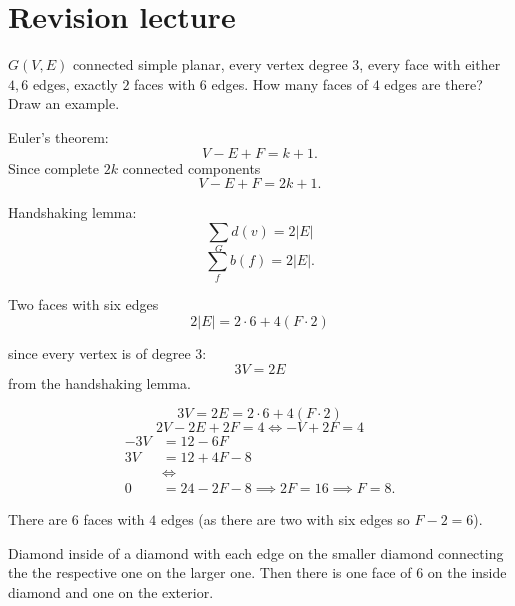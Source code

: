 \documentclass[10pt, a4paper]{article}
\begin{document}
\section{Revision lecture}

\begin{problem}
    $G(V, E)$ connected simple planar,
    every vertex degree $3$,
    every face with either $4, 6$ edges,
    exactly $2$ faces with $6$ edges.
    How many faces of $4$ edges are there?
    Draw an example.

    \begin{solution}
        Euler's theorem:
        \[
        V - E + F = k + 1.
        \]
        Since complete $2k$ connected components
        \[
        V - E + F = 2k + 1.
        \]
        
        Handshaking lemma:
        \[
        \sum_{G}d(v) = 2|E|
        \]
        \[
        \sum_{f}b(f) = 2|E|.
        \]

        Two faces with six edges
        \[
        2|E| = 2 \cdot 6 + 4(F \cdot 2)
        \]

        since every vertex is of degree $3$:
        \[
        3V = 2E
        \]
        from the handshaking lemma.

        \[
        3V = 2E = 2 \cdot 6 + 4(F \cdot 2)
        \]
        \[
        2V - 2E + 2F = 4 \iff -V + 2F = 4
        \]
        \begin{align*}
            -3V &= 12 - 6F \\
            3V &= 12 + 4F - 8 \\
            &\iff \\
            0 &= 24 - 2F - 8 \implies 2F = 16 \implies F = 8.
        \end{align*}

        There are $6$ faces with $4$ edges
        (as there are two with six edges so $F - 2 = 6$).

        Diamond inside of a diamond with each edge on the smaller diamond connecting the the respective one on the larger one.
        Then there is one face of $6$ on the inside diamond and one on the exterior.
        
    \end{solution}
\end{problem}
\end{document}
